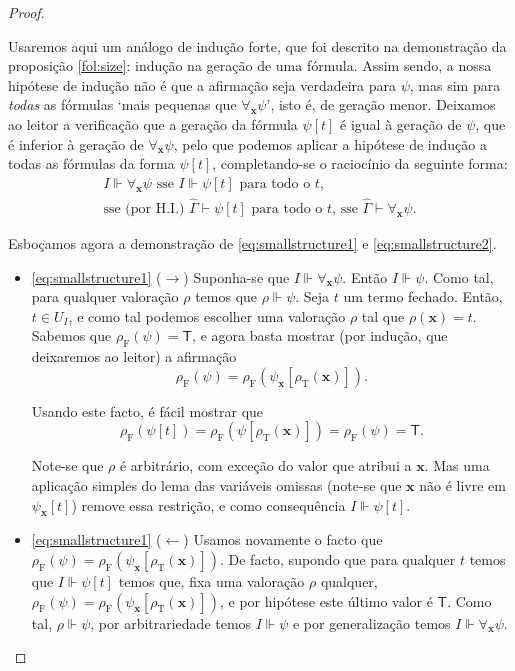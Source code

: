 \documentclass{report}
\theoremstyle{definition}
\theoremstyle{remark}
\renewcommand{\bf}[1]{\mathbf{#1}}
\newcommand{\F}{\mathrm{F}}
\newcommand{\T}{\mathrm{T}}
\newcommand{\lt}{\mathsf{T}}
\begin{document}
\begin{proof}
\begin{itemize}
	Usaremos aqui um análogo de indução forte, que foi descrito na demonstração da proposição \ref{fol:size}: indução na geração de uma fórmula. Assim sendo, a nossa hipótese de indução não é que a afirmação seja verdadeira para $\psi$, mas sim para \emph{todas} as fórmulas `mais pequenas que $\forall_{\bf x} \psi$', isto é, de geração menor. Deixamos ao leitor a verificação que a geração da fórmula $\psi[t]$ é igual à geração de $\psi$, que é inferior à geração de $\forall_{\bf x} \psi$, pelo que podemos aplicar a hipótese de indução a todas as fórmulas da forma $\psi[t]$, completando-se o raciocínio da seguinte forma:
	\begin{multline*}
I \Vdash \forall_{\bf x} \psi \text{ sse } I \Vdash \psi[t] \text{ para todo o $t$,}\\
\text{sse (por H.I.) } \widehat\Gamma \vdash \psi[t] \text{ para todo o $t$, sse } \widehat\Gamma \vdash \forall_{\bf x} \psi.
	\end{multline*}
	\end{itemize}
	

	Esboçamos agora a demonstração de \eqref{eq:smallstructure1} e \eqref{eq:smallstructure2}. 

	\begin{itemize}

	\item \eqref{eq:smallstructure1} ($\rightarrow$) Suponha-se que $I \Vdash \forall_{\bf x} \psi$. Então $I \Vdash \psi$. Como tal, para qualquer valoração $\rho$ temos que $\rho \Vdash \psi$. Seja $t$ um termo fechado. Então, $t \in U_I$, e como tal podemos escolher uma valoração $\rho$ tal que $\rho(\bf x) = t$. Sabemos que $\rho_\F(\psi) = \lt$, e agora basta mostrar (por indução, que deixaremos ao leitor) a afirmação
\[\rho_\F(\psi) = \rho_\F(\psi_{\bf x}[\rho_\T(\bf x)]).\]

Usando este facto, é fácil mostrar que
\[\rho_\F(\psi[t]) = \rho_\F(\psi[\rho_\T(\bf x)]) = \rho_\F(\psi) = \lt.\]
	
	Note-se que $\rho$ é arbitrário, com exceção do valor que atribui a $\bf x$. Mas uma aplicação simples do lema das variáveis omissas (note-se que $\bf x$ não é livre em $\psi_{\bf x}[t]$) remove essa restrição, e como consequência $I \Vdash \psi[t]$.

	\item \eqref{eq:smallstructure1} ($\leftarrow$) Usamos novamente o facto que $\rho_\F(\psi) = \rho_\F(\psi_{\bf x}[\rho_\T(\bf x)])$. De facto, supondo que para qualquer $t$ temos que $I \Vdash \psi[t]$ temos que, fixa uma valoração $\rho$ qualquer, $\rho_\F(\psi) = \rho_\F(\psi_{\bf x}[\rho_\T(\bf x)])$, e por hipótese este último valor é $\lt$. Como tal, $\rho \Vdash \psi$, por arbitrariedade temos $I \Vdash \psi$ e por generalização temos $I \Vdash \forall_{\bf x} \psi$.


\end{itemize}
\end{proof}
\end{document}
